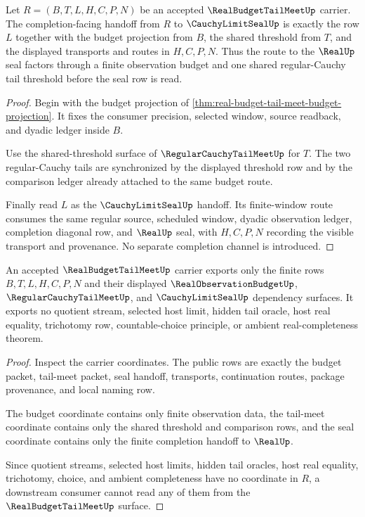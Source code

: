 \begin{theorem}
\label{thm:real-budget-tail-meet-seal-handoff}
Let $R=(B,T,L,H,C,P,N)$ be an accepted $\RealBudgetTailMeetUp$ carrier. The completion-facing handoff from $R$ to $\CauchyLimitSealUp$ is exactly the row $L$ together with the budget projection from $B$, the shared threshold from $T$, and the displayed transports and routes in $H,C,P,N$. Thus the route to the $\RealUp$ seal factors through a finite observation budget and one shared regular-Cauchy tail threshold before the seal row is read.
\end{theorem}
\begin{proof}
Begin with the budget projection of \autoref{thm:real-budget-tail-meet-budget-projection}. It fixes the consumer precision, selected window, source readback, and dyadic ledger inside $B$.

Use the shared-threshold surface of $\RegularCauchyTailMeetUp$ for $T$. The two regular-Cauchy tails are synchronized by the displayed threshold row and by the comparison ledger already attached to the same budget route.

Finally read $L$ as the $\CauchyLimitSealUp$ handoff. Its finite-window route consumes the same regular source, scheduled window, dyadic observation ledger, completion diagonal row, and $\RealUp$ seal, with $H,C,P,N$ recording the visible transport and provenance. No separate completion channel is introduced.
\end{proof}

\begin{theorem}
\label{thm:real-budget-tail-meet-nonescape}
An accepted $\RealBudgetTailMeetUp$ carrier exports only the finite rows $B,T,L,H,C,P,N$ and their displayed $\RealObservationBudgetUp$, $\RegularCauchyTailMeetUp$, and $\CauchyLimitSealUp$ dependency surfaces. It exports no quotient stream, selected host limit, hidden tail oracle, host real equality, trichotomy row, countable-choice principle, or ambient real-completeness theorem.
\end{theorem}
\begin{proof}
Inspect the carrier coordinates. The public rows are exactly the budget packet, tail-meet packet, seal handoff, transports, continuation routes, package provenance, and local naming row.

The budget coordinate contains only finite observation data, the tail-meet coordinate contains only the shared threshold and comparison rows, and the seal coordinate contains only the finite completion handoff to $\RealUp$.

Since quotient streams, selected host limits, hidden tail oracles, host real equality, trichotomy, choice, and ambient completeness have no coordinate in $R$, a downstream consumer cannot read any of them from the $\RealBudgetTailMeetUp$ surface.
\end{proof}

